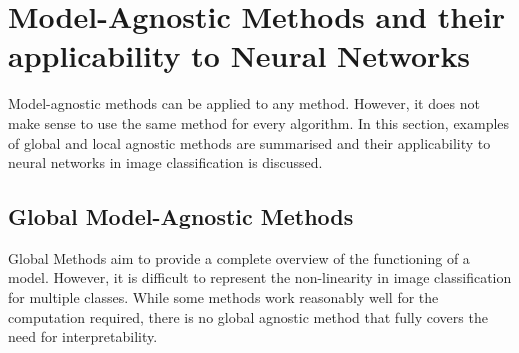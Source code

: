 \section{Model-Agnostic Methods and their applicability to Neural Networks}

Model-agnostic methods can be applied to any method. However, it does not make sense to use the same method for every algorithm. In this section, examples of global and local agnostic methods are summarised and their applicability to neural networks in image classification is discussed. 


\subsection{Global Model-Agnostic Methods}

Global Methods aim to provide a complete overview of the functioning of a model. However, it is difficult to represent the non-linearity in image classification for multiple classes. While some methods work reasonably well for the computation required, there is no global agnostic method that fully covers the need for interpretability.

